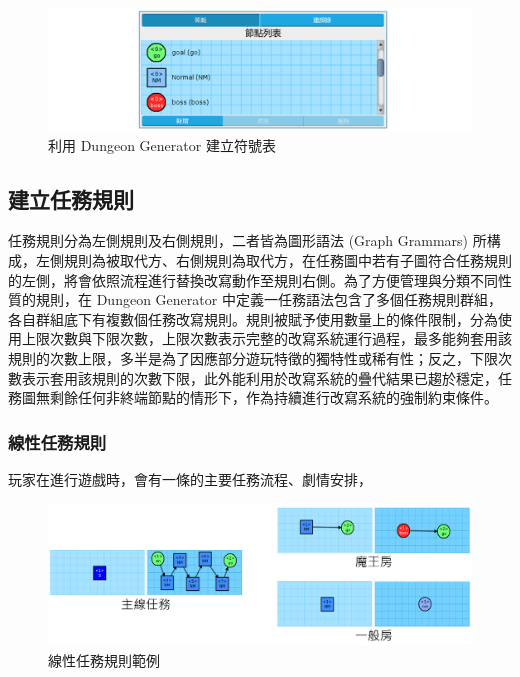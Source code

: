\begin{figure}[ht]
  \begin{center}
    \includegraphics[width=1.0\textwidth]{figures/missiongrammars-alphabet-manual.png}
    \caption{利用 Dungeon Generator 建立符號表} 
    \label{fig:missiongrammars-alphabet-manual}
  \end{center}
\end{figure}

\subsection{建立任務規則}
\label{ssec:method-missiongrammars-rules}

任務規則分為左側規則及右側規則，二者皆為圖形語法 (Graph Grammars) 所構成，左側規則為被取代方、右側規則為取代方，在任務圖中若有子圖符合任務規則的左側，將會依照流程進行替換改寫動作至規則右側。為了方便管理與分類不同性質的規則，在 Dungeon Generator 中定義一任務語法包含了多個任務規則群組，各自群組底下有複數個任務改寫規則。規則被賦予使用數量上的條件限制，分為使用上限次數與下限次數，上限次數表示完整的改寫系統運行過程，最多能夠套用該規則的次數上限，多半是為了因應部分遊玩特徵的獨特性或稀有性；反之，下限次數表示套用該規則的次數下限，此外能利用於改寫系統的疊代結果已趨於穩定，任務圖無剩餘任何非終端節點的情形下，作為持續進行改寫系統的強制約束條件。

\subsubsection{線性任務規則}
\label{sssec:method-missiongrammars-rules-linearrules}

玩家在進行遊戲時，會有一條的主要任務流程、劇情安排，


\begin{figure}[ht]
  \begin{center}
    \includegraphics[width=1.0\textwidth]{figures/missiongrammars-rules-linear-example.png}
    \caption{線性任務規則範例} 
    \label{fig:missiongrammars-rules-linear-example}
  \end{center}
\end{figure}

